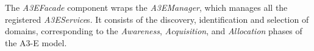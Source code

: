 

The \textit{A3EFacade} component wraps the \textit{A3EManager}, which manages all the registered \textit{A3EService}s. It consists of the discovery, identification and selection of domains, corresponding to the \textit{Awareness}, \textit{Acquisition}, and \textit{Allocation} phases of the A3-E model. 

